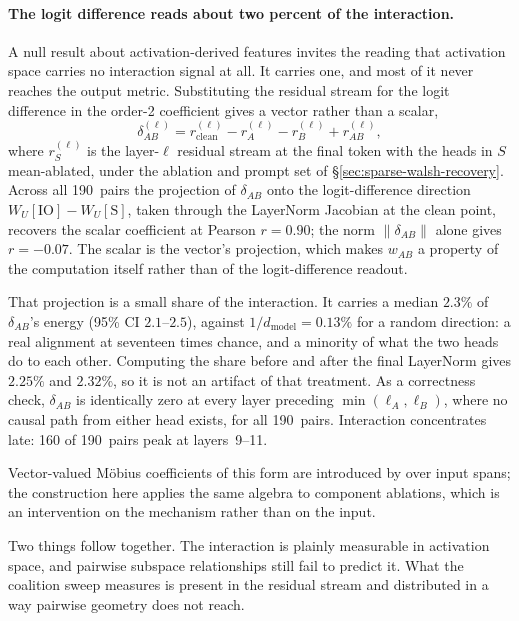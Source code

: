 \paragraph{The logit difference reads about two percent of the interaction.}
A null result about activation-derived features invites the reading that activation
space carries no interaction signal at all. It carries one, and most of it never
reaches the output metric. Substituting the residual stream
for the logit difference in the order-2 coefficient gives a vector rather than a
scalar,
\begin{equation}
\delta_{AB}^{(\ell)}
  = r^{(\ell)}_{\text{clean}} - r^{(\ell)}_{A} - r^{(\ell)}_{B}
    + r^{(\ell)}_{AB},
\label{eq:delta-vector}
\end{equation}
where $r^{(\ell)}_{S}$ is the layer-$\ell$ residual stream at the final token with the
heads in $S$ mean-ablated, under the ablation and prompt set of
\S\ref{sec:sparse-walsh-recovery}. Across all 190~pairs the projection of $\delta_{AB}$ onto the logit-difference
direction $W_U[\text{IO}] - W_U[\text{S}]$, taken through the LayerNorm Jacobian at
the clean point, recovers the scalar coefficient at Pearson $r = 0.90$; the norm
$\lVert \delta_{AB} \rVert$ alone gives $r = {-}0.07$. The scalar is the vector's
projection, which makes $w_{AB}$ a property of the computation itself rather than of
the logit-difference readout.

That projection is a small share of the interaction. It carries a median $2.3\%$ of
$\delta_{AB}$'s energy (95\% CI $2.1$--$2.5$), against $1/d_{\text{model}} = 0.13\%$
for a random direction: a real alignment at seventeen times chance, and a minority of
what the two heads do to each other. Computing the share before and after the final
LayerNorm gives $2.25\%$ and $2.32\%$, so it is not an artifact of that treatment. As a correctness check, $\delta_{AB}$
is identically zero at every layer preceding $\min(\ell_A, \ell_B)$, where no causal
path from either head exists, for all 190~pairs. Interaction concentrates late: 160 of 190~pairs peak at layers~9--11.

Vector-valued M\"obius coefficients of this form are introduced by
\citet{jansma2026compositional} over input spans; the construction
here applies the same algebra to component ablations, which is an intervention on the
mechanism rather than on the input.

Two things follow together. The interaction is plainly measurable in activation
space, and pairwise subspace relationships still fail to predict it. What the coalition
sweep measures is present in the residual stream and distributed in a way pairwise
geometry does not reach.

